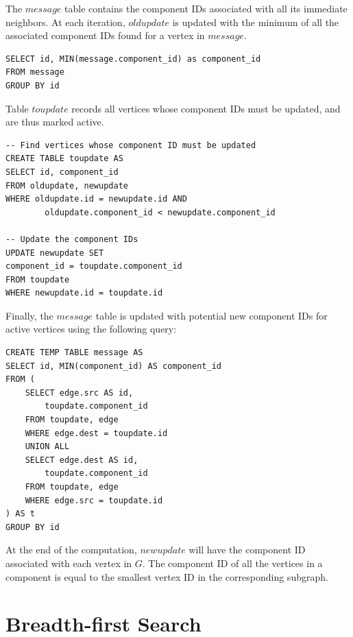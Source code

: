 The $message$ table contains the component IDs associated with all its
immediate neighbors. At each iteration, $oldupdate$ is updated with the
minimum of all the associated component IDs found for a vertex in $message$.

\begin{algorithm}
\begin{lstlisting}
SELECT id, MIN(message.component_id) as component_id
FROM message
GROUP BY id
\end{lstlisting}
\end{algorithm}

Table $toupdate$ records all vertices whose component IDs must be updated,
and are thus marked active.

\begin{algorithm}
\begin{lstlisting}
-- Find vertices whose component ID must be updated
CREATE TABLE toupdate AS
SELECT id, component_id
FROM oldupdate, newupdate
WHERE oldupdate.id = newupdate.id AND
        oldupdate.component_id < newupdate.component_id

-- Update the component IDs
UPDATE newupdate SET
component_id = toupdate.component_id
FROM toupdate
WHERE newupdate.id = toupdate.id
\end{lstlisting}
\end{algorithm}

Finally, the $message$ table is updated with potential new
component IDs for active vertices using the following query:

\begin{algorithm}
\begin{lstlisting}
CREATE TEMP TABLE message AS
SELECT id, MIN(component_id) AS component_id
FROM (
    SELECT edge.src AS id,
        toupdate.component_id
    FROM toupdate, edge
    WHERE edge.dest = toupdate.id
    UNION ALL
    SELECT edge.dest AS id,
        toupdate.component_id
    FROM toupdate, edge
    WHERE edge.src = toupdate.id
) AS t
GROUP BY id
\end{lstlisting}
\end{algorithm}

At the end of the computation, $newupdate$ will have the component ID
associated with each vertex in $G$. The component ID of all the vertices
in a component is equal to the smallest vertex ID in the corresponding
subgraph.

\section{Breadth-first Search} \label{sec:graph:bfs}

